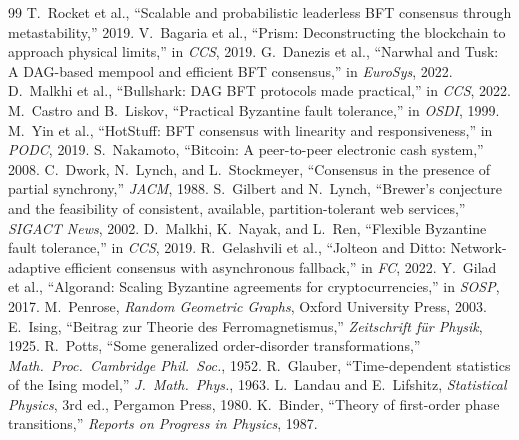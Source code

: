 \begin{thebibliography}{99}
 T.~Rocket et al., ``Scalable and probabilistic leaderless BFT consensus through metastability,'' 2019.
 V.~Bagaria et al., ``Prism: Deconstructing the blockchain to approach physical limits,'' in \emph{CCS}, 2019.
 G.~Danezis et al., ``Narwhal and Tusk: A DAG-based mempool and efficient BFT consensus,'' in \emph{EuroSys}, 2022.
 D.~Malkhi et al., ``Bullshark: DAG BFT protocols made practical,'' in \emph{CCS}, 2022.
 M.~Castro and B.~Liskov, ``Practical Byzantine fault tolerance,'' in \emph{OSDI}, 1999.
 M.~Yin et al., ``HotStuff: BFT consensus with linearity and responsiveness,'' in \emph{PODC}, 2019.
 S.~Nakamoto, ``Bitcoin: A peer-to-peer electronic cash system,'' 2008.
 C.~Dwork, N.~Lynch, and L.~Stockmeyer, ``Consensus in the presence of partial synchrony,'' \emph{JACM}, 1988.
 S.~Gilbert and N.~Lynch, ``Brewer's conjecture and the feasibility of consistent, available, partition-tolerant web services,'' \emph{SIGACT News}, 2002.
 D.~Malkhi, K.~Nayak, and L.~Ren, ``Flexible Byzantine fault tolerance,'' in \emph{CCS}, 2019.
 R.~Gelashvili et al., ``Jolteon and Ditto: Network-adaptive efficient consensus with asynchronous fallback,'' in \emph{FC}, 2022.
 Y.~Gilad et al., ``Algorand: Scaling Byzantine agreements for cryptocurrencies,'' in \emph{SOSP}, 2017.
 M.~Penrose, \emph{Random Geometric Graphs}, Oxford University Press, 2003.
 E.~Ising, ``Beitrag zur Theorie des Ferromagnetismus,'' \emph{Zeitschrift f\"ur Physik}, 1925.
 R.~Potts, ``Some generalized order-disorder transformations,'' \emph{Math.\ Proc.\ Cambridge Phil.\ Soc.}, 1952.
 R.~Glauber, ``Time-dependent statistics of the Ising model,'' \emph{J.\ Math.\ Phys.}, 1963.
 L.~Landau and E.~Lifshitz, \emph{Statistical Physics}, 3rd ed., Pergamon Press, 1980.
 K.~Binder, ``Theory of first-order phase transitions,'' \emph{Reports on Progress in Physics}, 1987.

\end{thebibliography}
